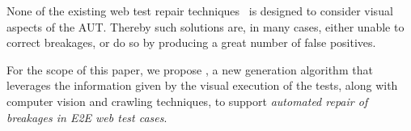 
None of the existing web test repair techniques~\cite{Choudhary:2011:WWA:2002931.2002935,Hammoudi-2016-FSE,2015-leotta-ICST} is designed to consider visual aspects of the AUT. Thereby such solutions are, in many cases, either unable to correct breakages, or do so by producing a great number of false positives. 


For the scope of this paper, we propose \tool, a new generation algorithm that leverages the information given by the visual execution of the tests, along with computer vision and crawling techniques, to support \textit{automated repair of breakages in E2E web test cases}. 

